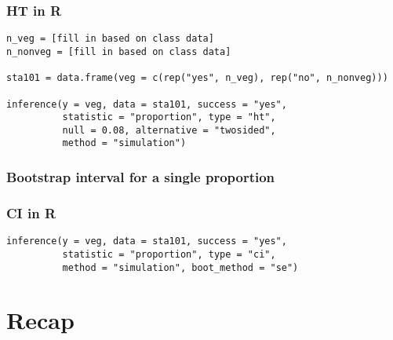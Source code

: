\documentclass[slidestop,compress,mathserif,12pt,t,professionalfonts,xcolor=table]{beamer}
\begin{document}

\begin{frame}[fragile]
\frametitle{HT in R}

{\scriptsize
\begin{Verbatim}[frame=single, formatcom=\color{blue}]
n_veg = [fill in based on class data]
n_nonveg = [fill in based on class data]

sta101 = data.frame(veg = c(rep("yes", n_veg), rep("no", n_nonveg)))

inference(y = veg, data = sta101, success = "yes", 
          statistic = "proportion", type = "ht", 
          null = 0.08, alternative = "twosided", 
          method = "simulation")
\end{Verbatim}
}

\end{frame}


\begin{frame}
\frametitle{Bootstrap interval for a single proportion}

\vfill


\vfill

\end{frame}


\begin{frame}[fragile]
\frametitle{CI in R}

{\scriptsize
\begin{Verbatim}[frame=single, formatcom=\color{blue}]
inference(y = veg, data = sta101, success = "yes", 
          statistic = "proportion", type = "ci", 
          method = "simulation", boot_method = "se")
\end{Verbatim}
}

\end{frame}


\section{Recap}

\end{document}
